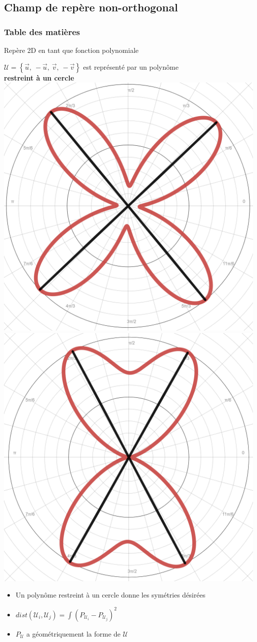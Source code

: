 \documentclass{beamer}
\begin{document}
\subsection{Champ de repère non-orthogonal}
\begin{frame}
    \frametitle{Table des matières}
    \tableofcontents[currentsubsection, sectionstyle=show/shaded, subsectionstyle=show/shaded/hide]
\end{frame}

\begin{frame}{Repère 2D en tant que fonction polynomiale}
    \centering
    \vspace*{0.2\baselineskip}
    \small{
    $\mathcal{U} = \left\{\vec{u},\ -\vec{u},\ \vec{v},\ -\vec{v}\right\}$ est représenté par un polynôme \\
    \textbf{restreint à un cercle} \\
    \vspace*{0.45\baselineskip}
    \includegraphics[width=0.36\linewidth]{img_spm_ff/poly_2D_8_2.PNG}
    \includegraphics[width=0.36\linewidth]{img_spm_ff/poly_2D_8_1.PNG}
    
    \begin{itemize}
    \item Un polynôme restreint à un cercle donne les symétries désirées
    \item $dist(\mathcal{U}_i, \mathcal{U}_j) = \int (P_{\mathcal{U}_i} - P_{\mathcal{U}_j})^2$
    \item $P_\mathcal{U}$ a géométriquement la forme de $\mathcal{U}$ 
    \end{itemize}
    }
\end{frame}
\end{document}
